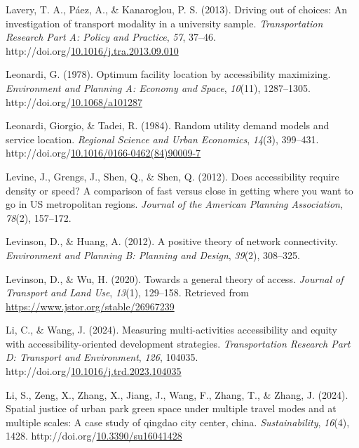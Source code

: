 \documentclass[
11pt, %
oneside, %
english, %
singlespacing, %
]{macthesis} %
\newlength{\cslhangindent}
\newenvironment{CSLReferences}[2] %
{\begin{list}{}{%
	\setlength{\itemindent}{0pt}
	\setlength{\leftmargin}{0pt}
	\setlength{\parsep}{0pt}
	\ifodd #1
	\setlength{\leftmargin}{\cslhangindent}
	\setlength{\itemindent}{-1\cslhangindent}
	\fi
	\setlength{\itemsep}{#2\baselineskip}}}
{\end{list}}
\begin{document}
\begin{CSLReferences}{1}{0}
Lavery, T. A., Páez, A., \& Kanaroglou, P. S. (2013). Driving out of choices: {An} investigation of transport modality in a university sample. \emph{Transportation Research Part A: Policy and Practice}, \emph{57}, 37--46. http://doi.org/\href{https://doi.org/10.1016/j.tra.2013.09.010}{10.1016/j.tra.2013.09.010}

Leonardi, G. (1978). Optimum facility location by accessibility maximizing. \emph{Environment and Planning A: Economy and Space}, \emph{10}(11), 1287--1305. http://doi.org/\href{https://doi.org/10.1068/a101287}{10.1068/a101287}

Leonardi, Giorgio, \& Tadei, R. (1984). Random utility demand models and service location. \emph{Regional Science and Urban Economics}, \emph{14}(3), 399--431. http://doi.org/\href{https://doi.org/10.1016/0166-0462(84)90009-7}{10.1016/0166-0462(84)90009-7}

Levine, J., Grengs, J., Shen, Q., \& Shen, Q. (2012). Does accessibility require density or speed? A comparison of fast versus close in getting where you want to go in US metropolitan regions. \emph{Journal of the American Planning Association}, \emph{78}(2), 157--172.

Levinson, D., \& Huang, A. (2012). A positive theory of network connectivity. \emph{Environment and Planning B: Planning and Design}, \emph{39}(2), 308--325.

Levinson, D., \& Wu, H. (2020). Towards a general theory of access. \emph{Journal of Transport and Land Use}, \emph{13}(1), 129--158. Retrieved from \url{https://www.jstor.org/stable/26967239}

Li, C., \& Wang, J. (2024). Measuring multi-activities accessibility and equity with accessibility-oriented development strategies. \emph{Transportation Research Part D: Transport and Environment}, \emph{126}, 104035. http://doi.org/\href{https://doi.org/10.1016/j.trd.2023.104035}{10.1016/j.trd.2023.104035}

Li, S., Zeng, X., Zhang, X., Jiang, J., Wang, F., Zhang, T., \& Zhang, J. (2024). Spatial justice of urban park green space under multiple travel modes and at multiple scales: A case study of qingdao city center, china. \emph{Sustainability}, \emph{16}(4), 1428. http://doi.org/\href{https://doi.org/10.3390/su16041428}{10.3390/su16041428}


\end{CSLReferences}
\end{document}

